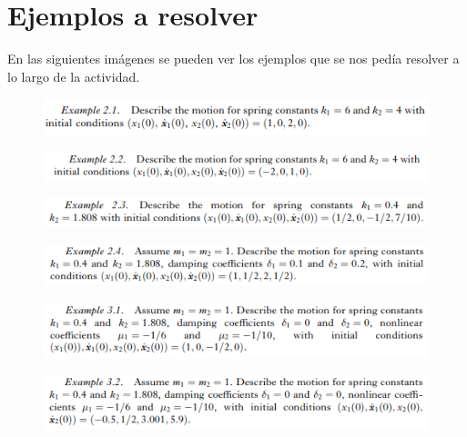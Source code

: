 \documentclass{article}
\begin{document}
\section {Ejemplos a resolver}
En las siguientes imágenes se pueden ver los ejemplos que se nos pedía resolver a lo largo de la actividad.
\begin{figure}[H]
    \includegraphics[width=1\textwidth]{Ejemplo2-1.PNG}
    \centering
    \label{Cod}
\end{figure}
\begin{figure}[H]
    \includegraphics[width=1\textwidth]{Ejemplo2-2.PNG}
    \centering
    \label{Cod}
\end{figure}
\begin{figure}[H]
    \includegraphics[width=1\textwidth]{Ejemplo2-3.PNG}
    \centering
    \label{Cod}
\end{figure}
\begin{figure}[H]
    \includegraphics[width=1\textwidth]{Ejemplo2-4.PNG}
    \centering
    \label{Cod}
\end{figure}
\begin{figure}[H]
    \includegraphics[width=1\textwidth]{Ejemplo3-1.PNG}
    \centering
    \label{Cod}
\end{figure}
\begin{figure}[H]
    \includegraphics[width=1\textwidth]{Ejemplo3-2.PNG}
    \centering
    \label{Cod}
\end{figure}
\end{document}
